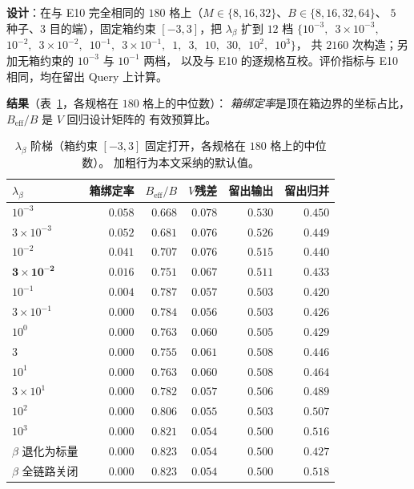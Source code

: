 \textbf{设计}：在与 E10 完全相同的 $180$ 格上（$M\in\{8,16,32\}$、$B\in\{8,16,32,64\}$、
$5$ 种子、$3$ 目的端），固定箱约束 $[-3,3]$，把 $\lambda_\beta$ 扩到 $12$ 档
$\{10^{-3},\,$ $3{\times}10^{-3},\,$ $10^{-2},\,$ $3{\times}10^{-2},\,$ $10^{-1},\,$
$3{\times}10^{-1},\,$ $1,\,$ $3,\,$ $10,\,$ $30,\,$ $10^2,\,$ $10^3\}$，
共 $2160$ 次构造；另加无箱约束的 $10^{-3}$ 与 $10^{-1}$ 两档，
以及与 E10 的逐规格互校。评价指标与 E10 相同，均在留出 Query 上计算。

\textbf{结果}（表~\ref{tab:lambda-ladder}，各规格在 $180$ 格上的中位数）：
\emph{箱绑定率}是顶在箱边界的坐标占比，$B_{\text{eff}}/B$ 是 $V$ 回归设计矩阵的
有效预算比。

\begin{table}[t]
  \centering
  \footnotesize
  \setlength{\tabcolsep}{2.8pt}
  \begin{tabular}{lrrrrr}
    \toprule
    $\lambda_\beta$ & 箱绑定率 & $B_{\text{eff}}/B$ & $V$残差 & 留出输出 & 留出归并 \\
    \midrule
    $10^{-3}$          & $0.058$ & $0.668$ & $0.078$ & $0.530$ & $0.450$ \\
    $3{\times}10^{-3}$ & $0.052$ & $0.681$ & $0.076$ & $0.526$ & $0.449$ \\
    $10^{-2}$          & $0.041$ & $0.707$ & $0.076$ & $0.515$ & $0.440$ \\
    $\mathbf{3{\times}10^{-2}}$ & $0.016$ & $0.751$ & $0.067$ & $0.511$ & $0.433$ \\
    $10^{-1}$          & $0.004$ & $0.787$ & $0.057$ & $0.503$ & $0.420$ \\
    $3{\times}10^{-1}$ & $0.000$ & $0.784$ & $0.056$ & $0.503$ & $0.426$ \\
    $10^{0}$           & $0.000$ & $0.763$ & $0.060$ & $0.505$ & $0.429$ \\
    $3$                & $0.000$ & $0.755$ & $0.061$ & $0.508$ & $0.446$ \\
    $10^{1}$           & $0.000$ & $0.763$ & $0.060$ & $0.508$ & $0.464$ \\
    $3{\times}10^{1}$  & $0.000$ & $0.782$ & $0.057$ & $0.506$ & $0.489$ \\
    $10^{2}$           & $0.000$ & $0.806$ & $0.055$ & $0.503$ & $0.507$ \\
    $10^{3}$           & $0.000$ & $0.821$ & $0.054$ & $0.500$ & $0.516$ \\
    \midrule
    $\beta$ 退化为标量 & $0.000$ & $0.823$ & $0.054$ & $0.500$ & $0.427$ \\
    $\beta$ 全链路关闭 & $0.000$ & $0.823$ & $0.054$ & $0.500$ & $0.518$ \\
    \bottomrule
  \end{tabular}
  \caption{$\lambda_\beta$ 阶梯（箱约束 $[-3,3]$ 固定打开，各规格在 $180$ 格上的中位数）。
  加粗行为本文采纳的默认值。}
  \label{tab:lambda-ladder}
\end{table}

